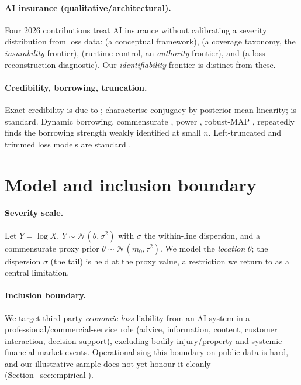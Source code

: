 \documentclass[11pt]{article}
\begin{document}
\paragraph{AI insurance (qualitative/architectural).} Four 2026 contributions treat AI insurance
without calibrating a severity distribution from loss data: \citet{zhu2026} (a conceptual
framework), \citet{leung2026insurability} (a coverage taxonomy, the \emph{insurability}
frontier), \citet{chen2026} (runtime control, an \emph{authority} frontier), and
\citet{leung2026cer} (a loss-reconstruction diagnostic). Our \emph{identifiability} frontier is
distinct from these.

\paragraph{Credibility, borrowing, truncation.} Exact credibility is due to \citet{jewell1974};
\citet{diaconis1979} characterise conjugacy by posterior-mean linearity; \citet{buhlmann2005} is
standard. Dynamic borrowing, commensurate \citep{hobbs2011}, power \citep{ibrahim2000,han2022},
robust-MAP \citep{schmidli2014}, repeatedly finds the borrowing strength weakly identified at
small $n$. Left-truncated and trimmed loss models are standard
\citep{klugman2019,kimjeon2013}.

\section{Model and inclusion boundary}\label{sec:model}
\paragraph{Severity scale.} Let $Y=\log X$, $Y\sim\mathcal{N}(\theta,\sigma^2)$ with $\sigma$ the
within-line dispersion, and a commensurate proxy prior $\theta\sim\mathcal{N}(m_0,\tau^2)$.
We model the \emph{location} $\theta$; the dispersion $\sigma$ (the tail) is held at the proxy
value, a restriction we return to as a central limitation.

\paragraph{Inclusion boundary.} We target third-party \emph{economic-loss} liability from an AI
system in a professional/commercial-service role (advice, information, content, customer
interaction, decision support), excluding bodily injury/property and systemic financial-market
events. Operationalising this boundary on public data is hard, and our illustrative sample does
not yet honour it cleanly (Section~\ref{sec:empirical}).
\end{document}
